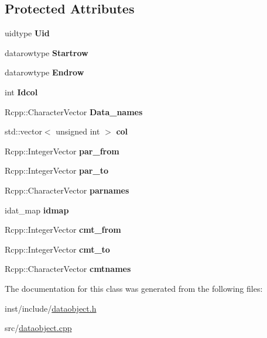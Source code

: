 \subsection*{Protected Attributes}
\begin{DoxyCompactItemize}
\item 
\mbox{\label{classdataobject_af7f42037224a63f823942bee20564f4b}} 
uidtype {\bfseries Uid}
\item 
\mbox{\label{classdataobject_a1af99aa30e3fa3f4228d23910ec1d662}} 
datarowtype {\bfseries Startrow}
\item 
\mbox{\label{classdataobject_add8078bc49b2517acb741f4e41dc279b}} 
datarowtype {\bfseries Endrow}
\item 
\mbox{\label{classdataobject_a71ba45d63a4ba661e61763ebcedf7992}} 
int {\bfseries Idcol}
\item 
\mbox{\label{classdataobject_a7fd729533f43533d03269d89ea304086}} 
Rcpp\+::\+Character\+Vector {\bfseries Data\+\_\+names}
\item 
\mbox{\label{classdataobject_a8831d627f892595fd54c27dc25dcd607}} 
std\+::vector$<$ unsigned int $>$ {\bfseries col}
\item 
\mbox{\label{classdataobject_a3d867408acb208e0c7a1f070cae5d299}} 
Rcpp\+::\+Integer\+Vector {\bfseries par\+\_\+from}
\item 
\mbox{\label{classdataobject_af16733b32bbf945a2b90a7d5e0a3d968}} 
Rcpp\+::\+Integer\+Vector {\bfseries par\+\_\+to}
\item 
\mbox{\label{classdataobject_a06b4a1186d2575f79c351c43396c9af0}} 
Rcpp\+::\+Character\+Vector {\bfseries parnames}
\item 
\mbox{\label{classdataobject_a338a8a79834d1d0d1c8c07b27afc7788}} 
idat\+\_\+map {\bfseries idmap}
\item 
\mbox{\label{classdataobject_a1c8d7c0b5fb5b25b1e684c9da2506489}} 
Rcpp\+::\+Integer\+Vector {\bfseries cmt\+\_\+from}
\item 
\mbox{\label{classdataobject_af343dae12c484026fbe2ae8f2e2d2a0c}} 
Rcpp\+::\+Integer\+Vector {\bfseries cmt\+\_\+to}
\item 
\mbox{\label{classdataobject_a5f253ce2cd8215febad559dfd663cb29}} 
Rcpp\+::\+Character\+Vector {\bfseries cmtnames}
\end{DoxyCompactItemize}


The documentation for this class was generated from the following files\+:\begin{DoxyCompactItemize}
\item 
inst/include/\hyperlink{dataobject_8h}{dataobject.\+h}\item 
src/\hyperlink{dataobject_8cpp}{dataobject.\+cpp}\end{DoxyCompactItemize}
